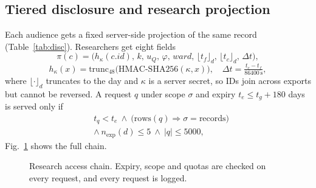 \documentclass[conference]{IEEEtran}
\begin{document}
\subsection{Tiered disclosure and research projection}\label{sec:priv}
Each audience gets a fixed server-side projection of the same record (Table~\ref{tab:disc}). Researchers get eight fields
\begin{equation}
\pi(c)=\bigl(h_\kappa(c.\mathit{id}),\,k,\,u_Q,\,\varphi,\,\mathit{ward},\,\lfloor t_f\rfloor_{d},\,\lfloor t_c\rfloor_{d},\,\Delta t\bigr),
\label{eq:proj}
\end{equation}
\begin{equation}
h_\kappa(x)=\mathrm{trunc}_{48}\bigl(\mathrm{HMAC\text{-}SHA256}(\kappa,x)\bigr),\quad \Delta t=\tfrac{t_c-t_f}{86400\,\mathrm{s}},
\label{eq:hmac}
\end{equation}
where $\lfloor\cdot\rfloor_d$ truncates to the day and $\kappa$ is a server secret, so IDs join across exports but cannot be reversed. A request $q$ under scope $\sigma$ and expiry $t_e\le t_g+180$ days is served only if
\begin{equation}
\begin{aligned}
&t_q<t_e\ \wedge\ \bigl(\text{rows}(q)\Rightarrow\sigma=\text{records}\bigr)\\
&\wedge\ n_{\mathrm{exp}}(d)\le5\ \wedge\ |q|\le5000,
\end{aligned}
\label{eq:quota}
\end{equation}
Fig.~\ref{fig:access} shows the full chain.

\begin{figure}[t]
\centering
{}
\caption{Research access chain. Expiry, scope and quotas are checked on every request, and every request is logged.}
\label{fig:access}
\end{figure}
\end{document}

